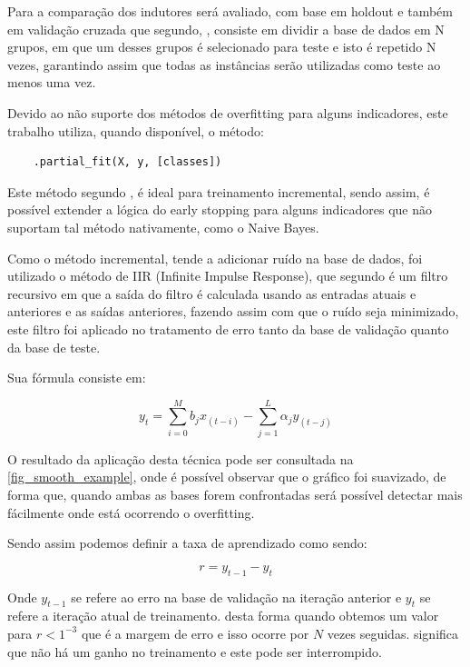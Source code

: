 \documentclass[
article,			%
11pt,				%
oneside,			%
a4paper,			%
english,			%
brazil,				%
sumario=tradicional,
]{abntex2}
\begin{document}
	Para a comparação dos indutores será avaliado, com base em holdout e também em validação cruzada que segundo, , consiste em dividir a base de dados em N grupos, em que um desses grupos é selecionado para teste e isto é repetido N vezes, garantindo assim que todas as instâncias serão utilizadas como teste ao menos uma vez.
	
	Devido ao não suporte dos métodos de overfitting para alguns indicadores, este trabalho utiliza, quando disponível, o método:
	
	\begin{verbatim}
	.partial_fit(X, y, [classes])
	\end{verbatim}
	
	Este método segundo , é ideal para treinamento incremental, sendo assim, é possível extender a lógica do early stopping para alguns indicadores que não suportam tal método nativamente, como o Naive Bayes.
	
	Como o método incremental, tende a adicionar ruído na base de dados, foi utilizado o método de IIR (Infinite Impulse Response), que segundo  é um filtro recursivo em que a saída do filtro é calculada usando as entradas atuais e anteriores e as saídas anteriores, fazendo assim com que o ruído seja minimizado, este filtro foi aplicado no tratamento de erro tanto da base de validação quanto da base de teste.
	
	Sua fórmula consiste em:
	
	\begin{equation}
	y_t = \sum_{i=0}^M b_jx_(t-i) - \sum_{j=1}^{L} \alpha_j y_(t-j)
	\end{equation}
	
	O resultado da aplicação desta técnica pode ser consultada na  \autoref{fig_smooth_example}, onde é possível observar que o gráfico foi suavizado, de forma que, quando ambas as bases forem confrontadas será possível detectar mais fácilmente onde está ocorrendo o overfitting.
	
	Sendo assim podemos definir a taxa de aprendizado como sendo:
	
	\begin{equation}
	r = {y_{t-1}} - {y_{t}}
	\end{equation}
	
	Onde \({y_{t-1}} \) se refere ao erro na base de validação na iteração anterior e \({y_t}\) se refere a iteração atual de treinamento. desta forma quando obtemos um valor para \(r < {1^{-3}}\) que é a margem de erro e isso ocorre por \(N\) vezes seguidas. significa que não há um ganho no treinamento e este pode ser interrompido.
 	
\end{document}
